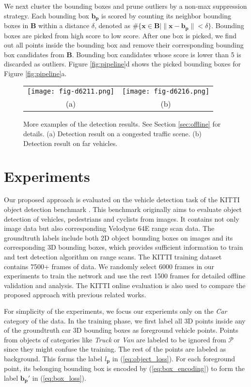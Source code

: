 \documentclass[conference]{IEEEtran}
\begin{document}
We next cluster the bounding boxes and prune outliers by a non-max suppression strategy. Each bounding box $\mathbf{b}_\mathbf{p}$ is scored by counting its neighbor bounding boxes in $\mathbf{B}$ within a distance $\delta$, denoted as $\#\{ \mathbf{x} \in \mathbf{B} | \| \mathbf{x} - \mathbf{b}_\mathbf{p} \| < \delta \}$. Bounding boxes are picked from high score to low score. After one box is picked, we find out all points inside the bounding box and remove their corresponding bounding box candidates from $\mathbf{B}$. Bounding box candidates whose score is lower than 5 is discarded as outliers. Figure \ref{fig:pipeline}d shows the picked bounding boxes for Figure \ref{fig:pipeline}a.

\begin{figure*}
\centering
\begin{tabular}{cc}
\texttt{[image: fig-d6211.png]} & \texttt{[image: fig-d6216.png]} \\
(a) & (b)
\end{tabular}
\caption{More examples of the detection results. See Section \ref{sec:offline} for details. (a) Detection result on a congested traffic scene. (b) Detection result on far vehicles. }
\label{fig:samples}
\end{figure*}

\section{Experiments}
Our proposed approach is evaluated on the vehicle detection task of the KITTI object detection benchmark \cite{Geiger2012}. This benchmark originally aims to evaluate object detection of vehicles, pedestrians and cyclists from images. It contains not only image data but also corresponding Velodyne 64E range scan data. The groundtruth labels include both 2D object bounding boxes on images and its corresponding 3D bounding boxes, which provides sufficient information to train and test detection algorithm on range scans. The KITTI training dataset contains 7500+ frames of data. We randomly select 6000 frames in our experiments to train the network and use the rest 1500 frames for detailed offline validation and analysis. The KITTI online evaluation is also used to compare the proposed approach with previous related works.

For simplicity of the experiments, we focus our experiemts only on the \textit{Car} category of the data. In the training phase, we first label all 3D points inside any of the groundtruth car 3D bounding boxes as foreground vehicle points. Points from objects of categories like \textit{Truck} or \textit{Van} are labeled to be ignored from $\mathcal{P}$ since they might confuse the training. The rest of the points are labeled as background. This forms the label $l_\mathbf{p}$ in (\ref{eq:object_loss}). For each foreground point, its belonging bounding box is encoded by (\ref{eq:box_encoding}) to form the label $\mathbf{b}_\mathbf{p}'$ in (\ref{eq:box_loss}).
\end{document}

